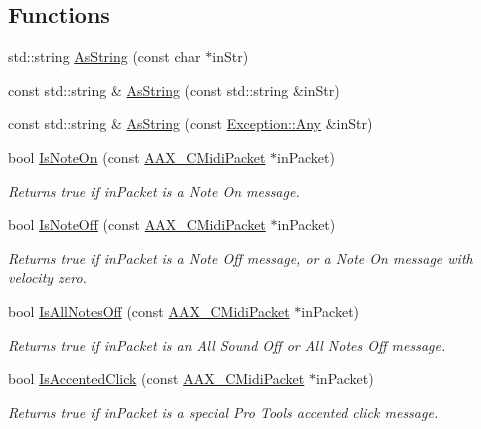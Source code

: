 \subsection*{Functions}
\begin{DoxyCompactItemize}
\item 
std\+::string \hyperlink{a00288_a8fbde5607de487515bcb55631bc1377d}{As\+String} (const char $\ast$in\+Str)
\item 
const std\+::string \& \hyperlink{a00288_a1bdf9d0d3be5b5f11d47df256a2e9490}{As\+String} (const std\+::string \&in\+Str)
\item 
const std\+::string \& \hyperlink{a00288_a9d87a7ed401f9deb8386a14c7bd8aaae}{As\+String} (const \hyperlink{a00143}{Exception\+::\+Any} \&in\+Str)
\item 
bool \hyperlink{a00288_a1561efb3b1dbe3d13ef18f4b4d9dee40}{Is\+Note\+On} (const \hyperlink{a00024}{A\+A\+X\+\_\+\+C\+Midi\+Packet} $\ast$in\+Packet)
\begin{DoxyCompactList}\small\item\em Returns true if {\ttfamily in\+Packet} is a Note On message. \end{DoxyCompactList}\item 
bool \hyperlink{a00288_a91041690c271a718ef9451f66a7f6bb2}{Is\+Note\+Off} (const \hyperlink{a00024}{A\+A\+X\+\_\+\+C\+Midi\+Packet} $\ast$in\+Packet)
\begin{DoxyCompactList}\small\item\em Returns true if {\ttfamily in\+Packet} is a Note Off message, or a Note On message with velocity zero. \end{DoxyCompactList}\item 
bool \hyperlink{a00288_a509974acde19fde832cd5fdeb5eaabe2}{Is\+All\+Notes\+Off} (const \hyperlink{a00024}{A\+A\+X\+\_\+\+C\+Midi\+Packet} $\ast$in\+Packet)
\begin{DoxyCompactList}\small\item\em Returns true if {\ttfamily in\+Packet} is an All Sound Off or All Notes Off message. \end{DoxyCompactList}\item 
bool \hyperlink{a00288_afd05400c946e625772428cad4be7d552}{Is\+Accented\+Click} (const \hyperlink{a00024}{A\+A\+X\+\_\+\+C\+Midi\+Packet} $\ast$in\+Packet)
\begin{DoxyCompactList}\small\item\em Returns true if {\ttfamily in\+Packet} is a special Pro Tools accented click message. \end{DoxyCompactList}\item 

\end{DoxyCompactItemize}
